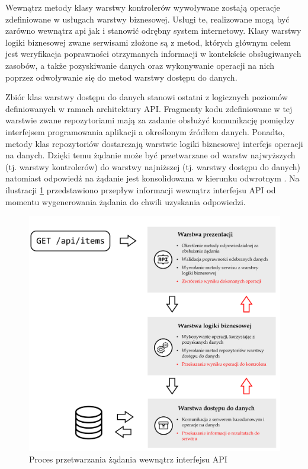 Wewnątrz metody klasy warstwy kontrolerów wywoływane zostają operacje zdefiniowane w usługach warstwy biznesowej. Usługi te, realizowane mogą być zarówno wewnątrz api jak i stanowić odrębny system internetowy. Klasy warstwy logiki biznesowej zwane serwisami złożone są z metod, których głównym celem jest weryfikacja poprawności otrzymanych informacji w kontekście obsługiwanych zasobów, a także pozyskiwanie danych oraz wykonywanie operacji na nich poprzez odwoływanie się do metod warstwy dostępu do danych.

Zbiór klas warstwy dostępu do danych stanowi ostatni z logicznych poziomów definiowanych w ramach architektury API. Fragmenty kodu zdefiniowane w tej warstwie zwane repozytoriami mają za zadanie obsłużyć komunikację pomiędzy interfejsem programowania aplikacji a określonym źródłem danych. Ponadto, metody klas repozytoriów dostarczają warstwie logiki biznesowej interfejs operacji na danych. Dzięki temu żądanie może być przetwarzane od warstw najwyższych (tj. warstwy kontrolerów) do warstwy najniższej (tj. warstwy dostępu do danych) natomiast odpowiedź na żądanie jest konsolidowana w kierunku odwrotnym \cite{kambalyal20103}. Na ilustracji \ref{fig:architektura-api} przedstawiono przepływ informacji wewnątrz interfejsu API od momentu wygenerowania żądania do chwili uzyskania odpowiedzi.

\begin{figure}[ht]
 \centering
  \includegraphics[width=0.9\linewidth]{rys02/architektura-api}
 \caption{Proces przetwarzania żądania wewnątrz interfejsu API}
 \label{fig:architektura-api}
\end{figure}
 

